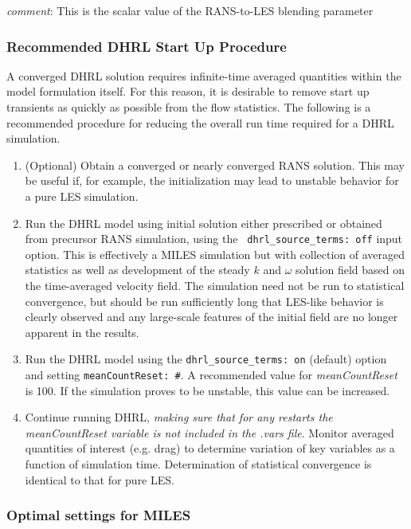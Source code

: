 {\it comment}: This is the scalar value of the RANS-to-LES blending parameter


\subsubsection{Recommended DHRL Start Up Procedure}

A converged DHRL solution requires infinite-time averaged quantities
within the model formulation itself. For this reason, it is desirable
to remove start up transients as quickly as possible from the flow
statistics. The following is a recommended procedure for reducing the
overall run time required for a DHRL simulation.

\begin{enumerate}
\item (Optional) Obtain a converged or nearly converged RANS
  solution. This may be useful if, for example, the initialization may
  lead to unstable behavior for a pure LES simulation.

\item Run the DHRL model using initial solution either prescribed or
  obtained from precursor RANS simulation, using the {\tt
    dhrl\_source\_terms: off} input option. This is effectively a
  MILES simulation but with collection of averaged statistics as well
  as development of the steady $k$ and $\omega$ solution field based
  on the time-averaged velocity field. The simulation need not be run
  to statistical convergence, but should be run sufficiently long that
  LES-like behavior is clearly observed and any large-scale features
  of the initial field are no longer apparent in the results.

\item Run the DHRL model using the {\tt dhrl\_source\_terms: on}
  (default) option and setting {\tt meanCountReset: \#}. A recommended
  value for {\it meanCountReset} is 100. If the simulation proves to
  be unstable, this value can be increased.

\item Continue running DHRL, {\it making sure that for any restarts
  the meanCountReset variable is not included in the .vars
  file}. Monitor averaged quantities of interest (e.g. drag) to
  determine variation of key variables as a function of simulation
  time. Determination of statistical convergence is identical to that
  for pure LES.
\end{enumerate}

\subsubsection{Optimal settings for MILES}

